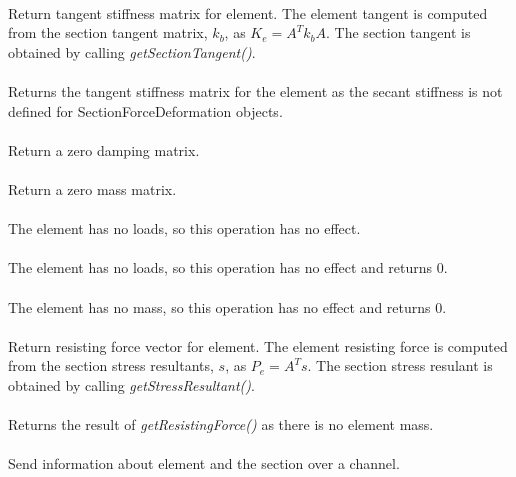  \\
Return tangent stiffness matrix for element.  The element tangent is computed
from the section tangent matrix, $k_b$, as $K_e = A^T k_b A$.  The section
tangent is obtained by calling {\em getSectionTangent()}.
\\

 \\    
Returns the tangent stiffness matrix for the element as the secant stiffness
is not defined for SectionForceDeformation objects.
\\

 \\    
Return a zero damping matrix.
\\

 \\    
Return a zero mass matrix.
\\

 \\	
The element has no loads, so this operation has no effect.
\\

 \\
The element has no loads, so this operation has no effect and returns 0.
\\

 \\    
The element has no mass, so this operation has no effect and returns 0.
\\

 \\
Return resisting force vector for element.  The element resisting force is computed
from the section stress resultants, $s$, as $P_e = A^T s$.  The section
stress resulant is obtained by calling {\em getStressResultant()}.
\\

 \\            
Returns the result of {\em getResistingForce()} as there is no element mass.
\\

 \\
Send information about element and the section over a channel.
\\

